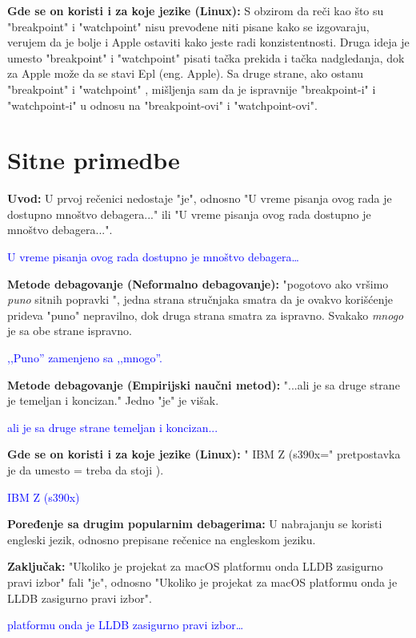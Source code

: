 \documentclass[a4paper]{report}
\newcommand{\odgovor}[1]{\textcolor{blue}{#1}}
\begin{document}
\textbf{Gde se on koristi i za koje jezike (Linux):} S obzirom da reči kao što su "breakpoint"{} i "watchpoint"{} nisu prevođene niti pisane kako se izgovaraju, verujem da je bolje i Apple 
ostaviti kako jeste radi konzistentnosti.
Druga ideja je umesto "breakpoint"{} i "watchpoint"{} pisati tačka prekida i tačka nadgledanja, dok za Apple može da se stavi Epl (eng. Apple). Sa druge strane, ako ostanu
"breakpoint"{} i "watchpoint" ,
mišljenja sam da je ispravnije "breakpoint-i"{} i "watchpoint-i"{} u odnosu na "breakpoint-ovi"{} i "watchpoint-ovi".

\section{Sitne primedbe}
\textbf{Uvod:} U prvoj rečenici nedostaje "je", odnosno "U vreme pisanja ovog rada je dostupno mnoštvo debagera..."{} ili "U vreme pisanja ovog rada dostupno je mnoštvo debagera...".

\odgovor{
  U vreme pisanja ovog rada dostupno je mnoštvo debagera\ldots
}

\textbf{Metode debagovanje (Neformalno debagovanje):} "pogotovo ako vršimo \textit{puno} sitnih popravki ", jedna strana stručnjaka smatra da je ovakvo korišćenje prideva
"puno" nepravilno, dok druga strana smatra za ispravno. Svakako \textit{mnogo} je sa obe strane ispravno.

\odgovor{,,Puno'' zamenjeno sa ,,mnogo''.}

\textbf{Metode debagovanje (Empirijski naučni metod):} "...ali je sa druge strane je temeljan i koncizan." Jedno "je"{} je višak.

\odgovor{ali je sa druge strane temeljan i koncizan...}

\textbf{Gde se on koristi i za koje jezike (Linux):} " IBM Z (s390x="{} pretpostavka je da umesto = treba da stoji ).

\odgovor{IBM Z (s390x)}

\textbf{Poređenje sa drugim popularnim debagerima: } U nabrajanju se koristi engleski jezik, odnosno prepisane rečenice na engleskom jeziku.

\textbf{Zaključak: } "Ukoliko je projekat za macOS platformu onda LLDB zasigurno pravi izbor"{} fali "je", odnosno "Ukoliko je projekat za macOS platformu onda je LLDB zasigurno pravi izbor".

\odgovor{platformu onda je LLDB zasigurno pravi izbor\ldots}
\end{document}
